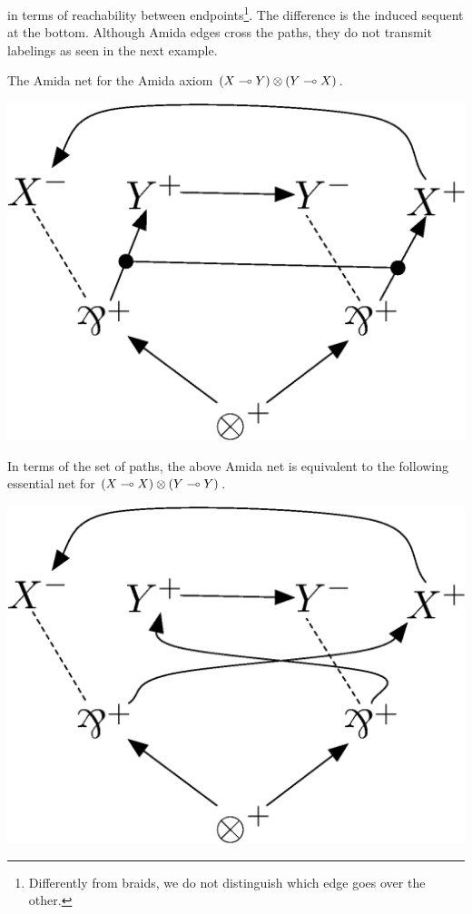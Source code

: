 in terms of reachability between endpoints\footnote{Differently from
braids, we do not distinguish which edge goes over the other.}.
The difference is the induced sequent at the bottom.
Although Amida edges cross the paths,
they do not transmit labelings as seen in the next example.
 \begin{example}
  The Amida net for the Amida axiom $(X\multimap Y)\otimes(Y\multimap X)$.
   \begin{center}
    \includegraphics[scale=0.4]{amida-axiom.eps}
   \end{center}
  In terms of the set of paths, the above Amida net is equivalent to the
  following essential net for $(X\multimap X)\otimes (Y\multimap Y)$.
   \begin{center}
    \includegraphics[scale=0.4]{amida-axiom-cross.eps}
   \end{center}
 \end{example}

